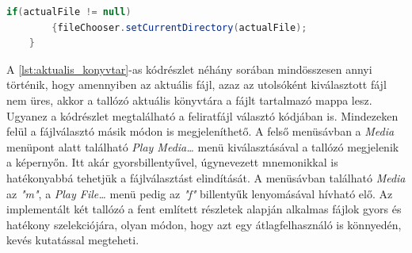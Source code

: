 \begin{spacing}{1.25}
\begin{lstlisting}[caption=Aktuális könyvtár beállítása, label={lst:aktualis_konyvtar}, language=java]
	if(actualFile != null)
	    {fileChooser.setCurrentDirectory(actualFile);
	}
\end{lstlisting}
\end{spacing}
        
A \ref{lst:aktualis_konyvtar}-as kódrészlet néhány sorában mindösszesen annyi történik, hogy amennyiben az aktuális fájl, azaz az utolsóként kiválasztott fájl nem üres, akkor a tallózó aktuális könyvtára a fájlt tartalmazó mappa lesz. Ugyanez a kódrészlet megtalálható a feliratfájl választó kódjában is. Mindezeken felül a fájlválasztó másik módon is megjeleníthető. A felső menüsávban a \textit{Media} menüpont alatt található \textit{Play Media…} menü kiválasztásával a tallózó megjelenik a képernyőn. Itt akár gyorsbillentyűvel, úgynevezett mnemonikkal is hatékonyabbá tehetjük a fájlválasztást elindítását. A menüsávban található \textit{Media} az \textit{"m"}, a \textit{Play File…} menü pedig az \textit{"f"} billentyűk lenyomásával hívható elő.
 Az implementált két tallózó a fent említett részletek alapján alkalmas fájlok gyors és hatékony szelekciójára, olyan módon, hogy azt egy átlagfelhasználó is könnyedén, kevés kutatással megteheti.
